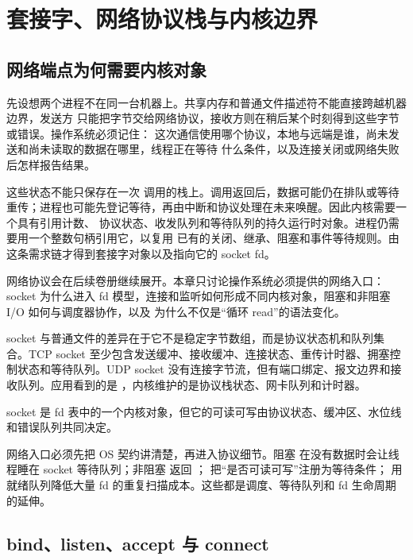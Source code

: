 \chapter{套接字、网络协议栈与内核边界}

\section{网络端点为何需要内核对象}

先设想两个进程不在同一台机器上。共享内存和普通文件描述符不能直接跨越机器边界，发送方
只能把字节交给网络协议，接收方则在稍后某个时刻得到这些字节或错误。操作系统必须记住：
这次通信使用哪个协议，本地与远端是谁，尚未发送和尚未读取的数据在哪里，线程正在等待
什么条件，以及连接关闭或网络失败后怎样报告结果。

这些状态不能只保存在一次  调用的栈上。调用返回后，数据可能仍在排队或等待
重传；进程也可能先登记等待，再由中断和协议处理在未来唤醒。因此内核需要一个具有引用计数、
协议状态、收发队列和等待队列的持久运行时对象。进程仍需要用一个整数句柄引用它，以复用
已有的关闭、继承、阻塞和事件等待规则。由这条需求链才得到套接字对象以及指向它的 socket fd。

网络协议会在后续卷册继续展开。本章只讨论操作系统必须提供的网络入口：socket 为什么进入
fd 模型，连接和监听如何形成不同内核对象，阻塞和非阻塞 I/O 如何与调度器协作，以及
 为什么不仅是“循环 read”的语法变化。

socket 与普通文件的差异在于它不是稳定字节数组，而是协议状态机和队列集合。TCP socket 至少包含发送缓冲、接收缓冲、连接状态、重传计时器、拥塞控制状态和等待队列。UDP socket 没有连接字节流，但有端口绑定、报文边界和接收队列。应用看到的是 ，内核维护的是协议栈状态、网卡队列和计时器。

\begin{keyidea}
socket 是 fd 表中的一个内核对象，但它的可读可写由协议状态、缓冲区、水位线和错误队列共同决定。
\end{keyidea}

网络入口必须先把 OS 契约讲清楚，再进入协议细节。阻塞  在没有数据时会让线程睡在 socket 等待队列；非阻塞  返回 ； 把“是否可读可写”注册为等待条件； 用就绪队列降低大量 fd 的重复扫描成本。这些都是调度、等待队列和 fd 生命周期的延伸。

\section{bind、listen、accept 与 connect}

